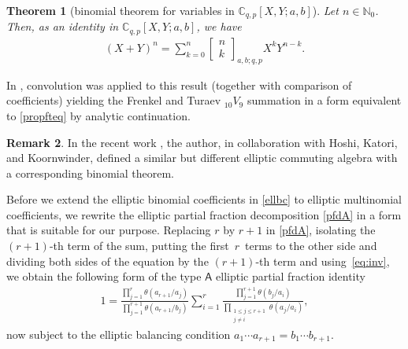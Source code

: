 \documentclass[10pt,a4paper]{amsart}
\numberwithin{equation}{section}
\newtheorem{Theorem}{Theorem}[section]
\theoremstyle{definition}
\newtheorem{Remark}[Theorem]{Remark}
\newcommand{\ta}{\theta}
\newcommand{\C}{\mathbb C}
\newcommand{\N}{\mathbb N}
\begin{document}
\begin{Theorem}[binomial theorem for %
 variables in ${\C_{q,p}[X,Y;a,b]}$]\label{ebthm}
 Let $n\in\N_0$.
 Then, as an identity in $\C_{q,p}[X,Y;a,b]$, we have
\begin{gather*}%
(X+Y)^n=\sum_{k=0}^n\begin{bmatrix}n\\k\end{bmatrix}_{a,b;q,p}X^kY^{n-k}.
\end{gather*}
\end{Theorem}

In \cite[Corollary~4]{S1}, convolution was applied to this result
(together with comparison of coefficients)
yielding the Frenkel and Turaev ${}_{10}V_9$ summation \cite{FT}
in a form equivalent to \eqref{propfteq} by analytic continuation.

\begin{Remark}\label{remHKKS}
In the recent work \cite[Definition~5.6 and Theorem~5.7]{HKKS}, the
author, in collaboration with Hoshi, Katori, and Koornwinder, defined
a similar but different elliptic commuting algebra
with a corresponding binomial theorem.
\end{Remark}

Before we extend the elliptic binomial coefficients in \eqref{ellbc}
to elliptic multinomial coefficients, we rewrite the elliptic
partial fraction decomposition \eqref{pfdA} in a form that
is suitable for our purpose.
Replacing $r$ by $r+1$ in \eqref{pfdA},
isolating the $(r+1)$-th term of the sum, putting the first~$r$~terms to the other side and dividing both sides of the
equation by the $(r+1)$-th term and using~\eqref{eq:inv},
we obtain the following
form of the type $\mathsf A$ elliptic partial fraction identity
\begin{gather}\label{pfd}
 1=\frac{\prod_{j=1}^r\ta(a_{r+1}/a_j)}
 {\prod_{j=1}^{r+1}\ta(a_{r+1}/b_j)}
 \sum_{i=1}^r\frac{\prod_{j=1}^{r+1}\ta(b_j/a_i)}
 {\prod_{\substack{1\le j\le r+1\\j\neq i}}\ta(a_j/a_i)},
\end{gather}
now subject to the elliptic balancing condition
$a_1\cdots a_{r+1}=b_1\cdots b_{r+1}$.
\end{document}
